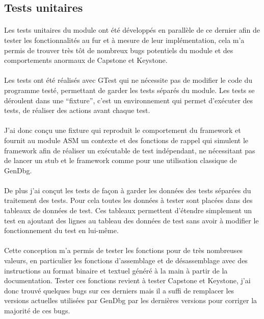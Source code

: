 \documentclass[11pt, book, english, french, standardlists]{upmethodology-document}
\begin{document}
			\subsection{Tests unitaires}
				\paragraph*{}
					Les tests unitaires du module ont été développés en parallèle de ce dernier afin de tester les fonctionnalités au fur et à mesure de leur implémentation, cela m'a permis de trouver très tôt de nombreux bugs potentiels du module et des comportements anormaux de Capstone et Keystone.
				\paragraph*{}
					Les tests ont été réalisés avec \gls{GTest} qui ne nécessite pas de modifier le code du programme testé, permettant de garder les tests séparés du module. Les tests se déroulent dans une ``fixture'', c'est un environnement qui permet d'exécuter des tests, de réaliser des actions avant chaque test.
				\paragraph*{}
					J'ai donc conçu une fixture qui reproduit le comportement du framework et fournit au module ASM un contexte et des fonctions de rappel qui simulent le framework afin de réaliser un exécutable de test indépendant, ne nécessitant pas de lancer un stub et le framework comme pour une utilisation classique de GenDbg.
				\paragraph*{}
					De plus j'ai conçut les tests de façon à garder les données des tests séparées du traitement des tests. Pour cela toutes les données à tester sont placées dans des tableaux de données de test. Ces tableaux permettent d'étendre simplement un test en ajoutant des lignes au tableau des données de test sans avoir à modifier le fonctionnement du test en lui-même.
				\paragraph*{}
					Cette conception m'a permis de tester les fonctions pour de très nombreuses valeurs, en particulier les fonctions d'assemblage et de désassemblage avec des instructions au format binaire et textuel généré à la main à partir de la documentation. Tester ces fonctions revient à tester Capstone et Keystone, j'ai donc trouvé quelques bugs sur ces derniers mais il a suffi de remplacer les versions actuelles utilisées par GenDbg par les dernières versions pour corriger la majorité de ces bugs.
\end{document}
